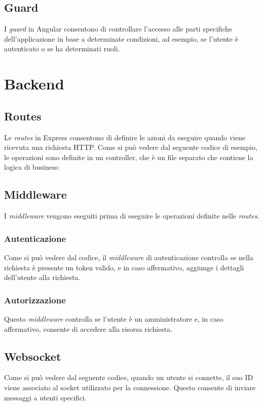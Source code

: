 

\subsection{Guard}

I \textit{guard} in Angular consentono di controllare l'accesso alle parti specifiche dell'applicazione in base a determinate condizioni, ad esempio, se l'utente è autenticato o se ha determinati ruoli.



\section{Backend}

\subsection{Routes}
Le \textit{routes} in Express consentono di definire le azioni da eseguire quando viene ricevuta una richiesta HTTP.
Come si può vedere dal seguente codice di esempio, le operazioni sono definite in un controller, che è un file separato che contiene la logica di business:


\subsection{Middleware}
I \textit{middleware} vengono eseguiti prima di eseguire le operazioni definite nelle \textit{routes}.

\subsubsection{Autenticazione}



Come si può vedere dal codice, il \textit{middleware} di autenticazione controlla se nella richiesta è presente un token valido, e in caso affermativo, aggiunge i dettagli dell'utente alla richiesta.

\subsubsection{Autorizzazione}



Questo \textit{middleware} controlla se l'utente è un amministratore e, in caso affermativo, consente di accedere alla risorsa richiesta.

\subsection{Websocket}
Come si può vedere dal seguente codice, quando un utente si connette, il suo ID viene associato al socket utilizzato per la connessione. Questo consente di inviare messaggi a utenti specifici.




